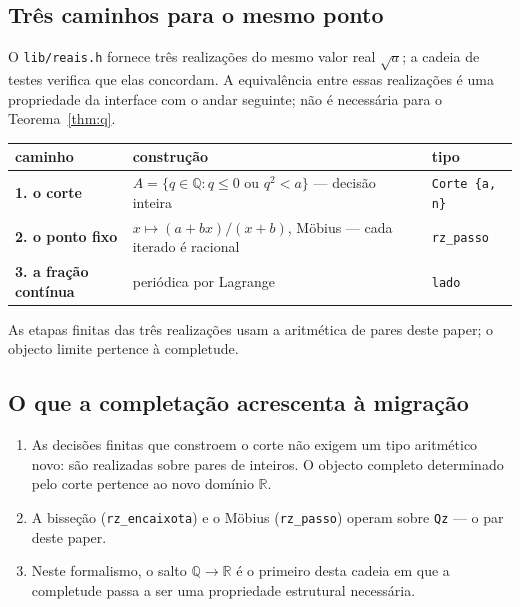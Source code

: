 \documentclass[11pt,a4paper]{article}
\newcommand{\code}[1]{\texttt{\small #1}}
\begin{document}
\subsection*{Três caminhos para o mesmo ponto}

O \code{lib/reais.h} fornece três realizações do mesmo valor real $\sqrt{a}$;
a cadeia de testes verifica que elas concordam. A equivalência entre essas
realizações é uma propriedade da interface com o andar seguinte; não é
necessária para o Teorema~\ref{thm:q}.

\begin{center}\small
\begin{tabular}{@{}lll@{}}
\toprule
caminho & construção & tipo \\
\midrule
\textbf{1. o corte} & $A=\{q\in\mathbb{Q}:q\leq 0 \text{ ou } q^2<a\}$ --- decisão inteira &
\code{Corte \{a, n\}} \\
\textbf{2. o ponto fixo} & $x\mapsto(a+bx)/(x+b)$, Möbius --- cada iterado é racional &
\code{rz\_passo} \\
\textbf{3. a fração contínua} & periódica por Lagrange & \code{lado} \\
\bottomrule
\end{tabular}
\end{center}

\noindent As etapas finitas das três realizações usam a aritmética de pares
deste paper; o objecto limite pertence à completude.

\subsection*{O que a completação acrescenta à migração}

\begin{enumerate}
  \item As decisões finitas que constroem o corte não exigem um tipo aritmético
        novo: são realizadas sobre pares de inteiros. O objecto completo
        determinado pelo corte pertence ao novo domínio $\mathbb{R}$.
  \item A bisseção (\code{rz\_encaixota}) e o Möbius (\code{rz\_passo}) operam
        sobre \code{Qz} --- o par deste paper.
  \item Neste formalismo, o salto $\mathbb{Q}\to\mathbb{R}$ é o primeiro desta
        cadeia em que a completude passa a ser uma propriedade estrutural
        necessária.
\end{enumerate}

\end{document}
